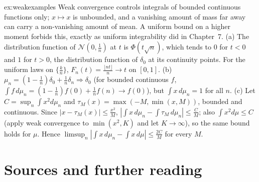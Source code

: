\begin{solution}{ex:weakexamples}
\idea Weak convergence controls integrals of bounded continuous functions only; $x\mapsto x$ is unbounded, and a vanishing amount of mass far away can carry a non-vanishing amount of mean. A uniform bound on a higher
moment forbids this, exactly as uniform integrability did in Chapter~7.
\writeup (a) The distribution function of $\mathcal N(0,\frac1n)$ at $t$ is $\Phi(t\sqrt n)$, which tends to $0$ for $t<0$ and $1$ for $t>0$, the distribution function of $\delta_0$ at its continuity points. For the uniform laws on
$\{\frac kn\}$, $F_n(t)=\frac{\lfloor nt\rfloor}n\to t$ on $[0,1]$. (b) $\mu_n=(1-\frac1n)\delta_0+\frac1n\delta_n\Rightarrow\delta_0$ (for bounded continuous $f$, $\int f\,d\mu_n=(1-\frac1n)f(0)+\frac1nf(n)\to f(0)$), but $\int x\,d\mu_n=1$ for all
$n$. (c) Let $C=\sup_n\int x^2d\mu_n$ and $\tau_M(x)=\max(-M,\min(x,M))$, bounded and continuous. Since $|x-\tau_M(x)|\le\frac{x^2}M$, $|\int x\,d\mu_n-\int\tau_M\,d\mu_n|\le\frac CM$; also $\int x^2d\mu\le C$ (apply weak convergence to
$\min(x^2,K)$ and let $K\to\infty$), so the same bound holds for $\mu$. Hence $\limsup_n|\int x\,d\mu_n-\int x\,d\mu|\le\frac{2C}M$ for every $M$.
\end{solution}

\section*{Sources and further reading}

